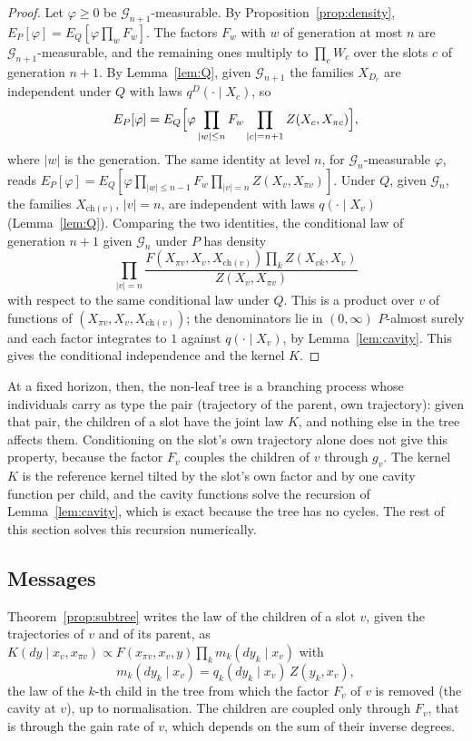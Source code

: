 \documentclass[11pt]{article}
\theoremstyle{plain}
\theoremstyle{definition}
\theoremstyle{remark}
\begin{document}
\begin{proof}
Let $\varphi\ge0$ be $\mathcal G_{n+1}$-measurable. By Proposition~\ref{prop:density}, $E_P[\varphi]=E_Q[\varphi\prod_wF_w]$. The factors $F_w$ with $w$ of generation at most $n$ are $\mathcal G_{n+1}$-measurable, and the remaining ones multiply to $\prod_cW_c$ over the slots $c$ of generation $n+1$. By Lemma~\ref{lem:Q}, given $\mathcal G_{n+1}$ the families $X_{D_c}$ are independent under $Q$ with laws $q^D(\cdot\mid X_c)$, so
\[
E_P[\varphi]=E_Q\Bigl[\varphi\prod_{|w|\le n}F_w\prod_{|c|=n+1}Z(X_c,X_{\pi c})\Bigr],
\]
where $|w|$ is the generation. The same identity at level $n$, for $\mathcal G_n$-measurable $\varphi$, reads $E_P[\varphi]=E_Q[\varphi\prod_{|w|\le n-1}F_w\prod_{|v|=n}Z(X_v,X_{\pi v})]$. Under $Q$, given $\mathcal G_n$, the families $X_{\mathrm{ch}(v)}$, $|v|=n$, are independent with laws $q(\cdot\mid X_v)$ (Lemma~\ref{lem:Q}). Comparing the two identities, the conditional law of generation $n+1$ given $\mathcal G_n$ under $P$ has density
\[
\prod_{|v|=n}\frac{F(X_{\pi v},X_v,X_{\mathrm{ch}(v)})\prod_kZ(X_{vk},X_v)}{Z(X_v,X_{\pi v})}
\]
with respect to the same conditional law under $Q$. This is a product over $v$ of functions of $(X_{\pi v},X_v,X_{\mathrm{ch}(v)})$; the denominators lie in $(0,\infty)$ $P$-almost surely and each factor integrates to $1$ against $q(\cdot\mid X_v)$, by Lemma~\ref{lem:cavity}. This gives the conditional independence and the kernel $K$.
\end{proof}

At a fixed horizon, then, the non-leaf tree is a branching process whose individuals carry as type the pair (trajectory of the parent, own trajectory): given that pair, the children of a slot have the joint law $K$, and nothing else in the tree affects them. Conditioning on the slot's own trajectory alone does not give this property, because the factor $F_v$ couples the children of $v$ through $g_v$. The kernel $K$ is the reference kernel tilted by the slot's own factor and by one cavity function per child, and the cavity functions solve the recursion of Lemma~\ref{lem:cavity}, which is exact because the tree has no cycles. The rest of this section solves this recursion numerically.


\subsection{Messages}

Theorem~\ref{prop:subtree} writes the law of the children of a slot $v$, given the trajectories of $v$ and of its parent, as $K(dy\mid x_v,x_{\pi v})\propto F(x_{\pi v},x_v,y)\prod_k m_k(dy_k\mid x_v)$ with
\[
m_k(dy_k\mid x_v)=q_k(dy_k\mid x_v)\,Z(y_k,x_v),
\]
the law of the $k$-th child in the tree from which the factor $F_v$ of $v$ is removed (the cavity at $v$), up to normalisation. The children are coupled only through $F_v$, that is through the gain rate of $v$, which depends on the sum of their inverse degrees.
\end{document}
